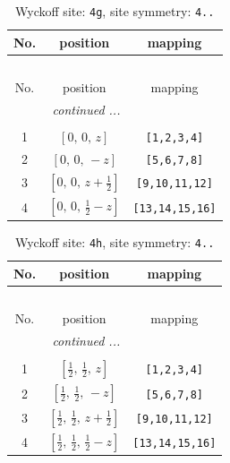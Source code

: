 \documentclass[fleqn,8pt]{jsarticle}
\begin{document}
\renewcommand{\arraystretch}{1.2}
\begin{longtable}{ccc}
\caption{Wyckoff site: {\tt 4g}, site symmetry: {\tt 4..}}
 \\
 \hline \hline
No. & position & mapping \\ \hline \endfirsthead

\multicolumn{2}{l}{\tablename\ \thetable{}} \\
 \hline \hline
No. & position & mapping \\ \hline \endhead

 \hline \hline
\multicolumn{2}{r}{\footnotesize\it continued ...} \\ \endfoot

 \hline \hline
\multicolumn{2}{r}{} \\ \endlastfoot

1 & $\left[ 0,\, 0,\, z \right]$ & {\tt [1,2,3,4]} \\ \hline
2 & $\left[ 0,\, 0,\, - z \right]$ & {\tt [5,6,7,8]} \\ \hline
3 & $\left[ 0,\, 0,\, z + \frac{1}{2} \right]$ & {\tt [9,10,11,12]} \\ \hline
4 & $\left[ 0,\, 0,\, \frac{1}{2} - z \right]$ & {\tt [13,14,15,16]} \\
\end{longtable}
\renewcommand{\arraystretch}{1.2}
\begin{longtable}{ccc}
\caption{Wyckoff site: {\tt 4h}, site symmetry: {\tt 4..}}
 \\
 \hline \hline
No. & position & mapping \\ \hline \endfirsthead

\multicolumn{2}{l}{\tablename\ \thetable{}} \\
 \hline \hline
No. & position & mapping \\ \hline \endhead

 \hline \hline
\multicolumn{2}{r}{\footnotesize\it continued ...} \\ \endfoot

 \hline \hline
\multicolumn{2}{r}{} \\ \endlastfoot

1 & $\left[ \frac{1}{2},\, \frac{1}{2},\, z \right]$ & {\tt [1,2,3,4]} \\ \hline
2 & $\left[ \frac{1}{2},\, \frac{1}{2},\, - z \right]$ & {\tt [5,6,7,8]} \\ \hline
3 & $\left[ \frac{1}{2},\, \frac{1}{2},\, z + \frac{1}{2} \right]$ & {\tt [9,10,11,12]} \\ \hline
4 & $\left[ \frac{1}{2},\, \frac{1}{2},\, \frac{1}{2} - z \right]$ & {\tt [13,14,15,16]} \\
\end{longtable}
\end{document}
